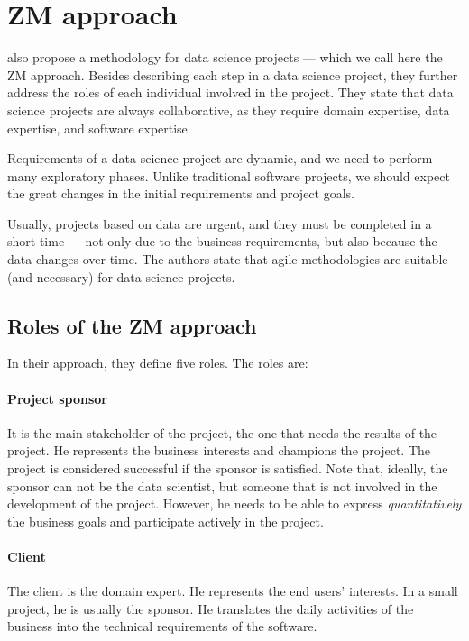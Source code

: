 \section{ZM approach}

\textcite{Zumel2019} also propose a methodology for data science projects --- which we
call here the ZM approach.  Besides
describing each step in a data science project, they further address the roles of each
individual involved in the project.  They state that data science projects are always
collaborative, as they require domain expertise, data expertise, and software expertise.

Requirements of a data science project are dynamic, and we need to perform many
exploratory phases.  Unlike traditional software projects, we should expect the
great changes in the initial requirements and project goals.

Usually,
projects based on data are urgent, and they must be completed in a short time --- not
only due to the business requirements, but also because the data changes over time.
The authors state that agile methodologies are suitable (and necessary) for data science
projects.

\subsection{Roles of the ZM approach}

In their approach, they define five roles.  The roles are:

\paragraph{Project sponsor}  It is the main stakeholder of the project, the one that needs the
results of the project.  He represents the business interests and champions the project.
The project is considered successful if the sponsor is satisfied.  Note that, ideally, the
sponsor can not be the data scientist, but someone that is not involved in the development
of the project.  However, he needs to be able to express \emph{quantitatively} the business
goals and participate actively in the project.

\paragraph{Client}  The client is the domain expert.  He represents the end users'
interests.  In a small project, he is usually the sponsor.  He translates the daily
activities of the business into the technical requirements of the software.

